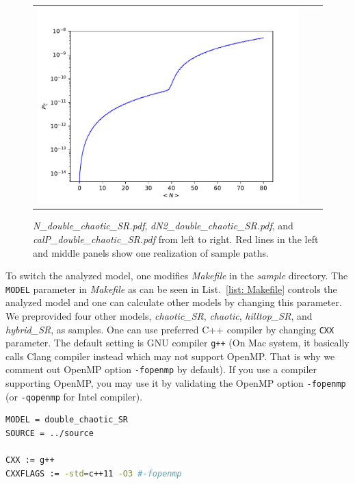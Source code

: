 \documentclass[aps, prd
, preprint
, nofootinbib 
, notitlepage
, superscriptaddress
, longbibliography
]{revtex4-1}
\begin{document}
\begin{figure}
\begin{tabular}{ccc}
\begin{minipage}{0.33\hsize}
			\includegraphics[width=\hsize]{figs/calP_double_chaotic_SR.pdf}
		\end{minipage}
	\end{tabular}
	\caption{\textit{N\_double\_chaotic\_SR.pdf}, \textit{dN2\_double\_chaotic\_SR.pdf}, and \textit{calP\_double\_chaotic\_SR.pdf} from left to right.
	Red lines in the left and middle panels show one realization of sample paths.}
	\label{fig: double_chaotic_conf}
\end{figure}

To switch the analyzed model, one modifies \textit{Makefile} in the \textit{sample} directory. The \texttt{MODEL} parameter in \textit{Makefile} 
as can be seen in List.~\ref{list: Makefile} controls the analyzed model and one can calculate other models by changing this parameter.
We preprovided four other models, \textit{chaotic\_SR}, \textit{chaotic}, \textit{hilltop\_SR}, and \textit{hybrid\_SR}, as samples.
One can use preferred C++ compiler by changing \texttt{CXX} parameter. The default setting is GNU compiler \texttt{g++} (On Mac system, it basically calls 
Clang compiler instead which may not support OpenMP. That is why we comment out OpenMP option \texttt{-fopenmp} by default).
If you use a compiler supporting OpenMP, you may use it by validating the OpenMP option \texttt{-fopenmp} (or \texttt{-qopenmp} for Intel compiler).

\begin{lstlisting}[language = bash, caption={\textit{sample/Makefile}}, label=list: Makefile]
MODEL = double_chaotic_SR
SOURCE = ../source

CXX := g++
CXXFLAGS := -std=c++11 -O3 #-fopenmp
\end{lstlisting}
\end{document}
